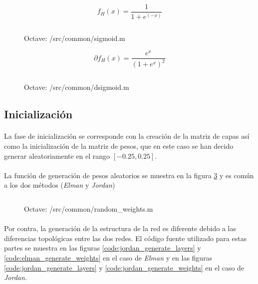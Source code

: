 \documentclass[10pt, a4paper,spanish]{article}
\begin{document}
			\begin{equation}
				f_H(x) = \frac{1}{1+e^(-x)}
			\end{equation}

			\begin{figure}[htpb!]
				\centering
				\inputminted{octave}{../src/common/sigmoid.m}
				\caption{Octave: /src/common/sigmoid.m}
				\label{code:sigmoid}
			\end{figure}

			\begin{equation}
				\partial f_H(x) = \frac{e^x}{(1 + e^x)^2}
			\end{equation}


			\begin{figure}[htpb!]
				\centering
				\inputminted{octave}{../src/common/dsigmoid.m}
				\caption{Octave: /src/common/dsigmoid.m}
				\label{code:dsigmoid}
			\end{figure}

		\subsection{Inicialización}

			\paragraph{}
			La fase de inicialización se corresponde con la creación de la matriz de capas así como la inicialización de la matriz de pesos, que en este caso se han decido generar aleatoriamente en el rango $[-0.25,0.25]$.

			\paragraph{}
			La función de generación de pesos aleatorios se muestra en la figura \ref{code:random_weights} y es común a los dos métodos (\emph{Elman} y \emph{Jordan})

			\begin{figure}[htpb!]
				\centering
				\inputminted{octave}{../src/common/random_weights.m}
				\caption{Octave: /src/common/random\_weights.m}
				\label{code:random_weights}
			\end{figure}

			\paragraph{}
			Por contra, la generación de la estructura de la red es diferente debido a las diferencias topológicas entre las dos redes. El código fuente utilizado para estas partes se muestra en las figuras \ref{code:jordan_generate_layers} y \ref{code:elman_generate_weights} en el caso de \emph{Elman} y en las figuras \ref{code:jordan_generate_layers} y \ref{code:jordan_generate_weights} en el caso de \emph{Jordan}.
\end{document}
